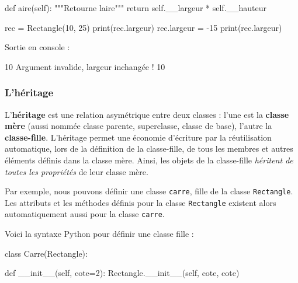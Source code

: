 \documentclass[
  letterpaper,
  DIV=11,
  numbers=noendperiod]{scrartcl}
\newenvironment{Shaded}{\begin{snugshade}}{\end{snugshade}}
\newcommand{\BuiltInTok}[1]{\textcolor[rgb]{0.00,0.23,0.31}{#1}}
\newcommand{\CommentTok}[1]{\textcolor[rgb]{0.37,0.37,0.37}{#1}}
\newcommand{\ControlFlowTok}[1]{\textcolor[rgb]{0.00,0.23,0.31}{#1}}
\newcommand{\DecValTok}[1]{\textcolor[rgb]{0.68,0.00,0.00}{#1}}
\newcommand{\FunctionTok}[1]{\textcolor[rgb]{0.28,0.35,0.67}{#1}}
\newcommand{\KeywordTok}[1]{\textcolor[rgb]{0.00,0.23,0.31}{#1}}
\newcommand{\NormalTok}[1]{\textcolor[rgb]{0.00,0.23,0.31}{#1}}
\newcommand{\OperatorTok}[1]{\textcolor[rgb]{0.37,0.37,0.37}{#1}}
\newcommand{\VariableTok}[1]{\textcolor[rgb]{0.07,0.07,0.07}{#1}}
\begin{document}
\begin{Shaded}
\begin{Highlighting}[]
    \KeywordTok{def}\NormalTok{ aire(}\VariableTok{self}\NormalTok{):}
        \CommentTok{"""Retourne l\textquotesingle{}aire"""}
        \ControlFlowTok{return} \VariableTok{self}\NormalTok{.\_\_largeur }\OperatorTok{*} \VariableTok{self}\NormalTok{.\_\_hauteur}


\NormalTok{rec }\OperatorTok{=}\NormalTok{ Rectangle(}\DecValTok{10}\NormalTok{, }\DecValTok{25}\NormalTok{)}
\BuiltInTok{print}\NormalTok{(rec.largeur)}
\NormalTok{rec.largeur }\OperatorTok{=} \OperatorTok{{-}}\DecValTok{15}
\BuiltInTok{print}\NormalTok{(rec.largeur)}
\end{Highlighting}
\end{Shaded}

Sortie en console :

\begin{Shaded}
\begin{Highlighting}[]
\DecValTok{10}
\NormalTok{Argument invalide, largeur inchangée }\OperatorTok{!}
\DecValTok{10}
\end{Highlighting}
\end{Shaded}

\hypertarget{lhuxe9ritage}{%
\subsubsection{L'héritage}\label{lhuxe9ritage}}

L'\textbf{héritage} est une relation asymétrique entre deux classes :
l'une est la \textbf{classe mère} (aussi nommée classe parente,
superclasse, classe de base), l'autre la \textbf{classe-fille}.
L'héritage permet une économie d'écriture par la réutilisation
automatique, lors de la définition de la classe-fille, de tous les
membres et autres éléments définis dans la classe mère. Ainsi, les
objets de la classe-fille \emph{héritent de toutes les propriétés} de
leur classe mère.

Par exemple, nous pouvons définir une classe \texttt{carre}, fille de la
classe \texttt{Rectangle}. Les attributs et les méthodes définis pour la
classe \texttt{Rectangle} existent alors automatiquement aussi pour la
classe \texttt{carre}.

Voici la syntaxe Python pour définir une classe fille :

\begin{Shaded}
\begin{Highlighting}[]
\KeywordTok{class}\NormalTok{ Carre(Rectangle):}

    \KeywordTok{def} \FunctionTok{\_\_init\_\_}\NormalTok{(}\VariableTok{self}\NormalTok{, cote}\OperatorTok{=}\DecValTok{2}\NormalTok{):}
\NormalTok{        Rectangle.}\FunctionTok{\_\_init\_\_}\NormalTok{(}\VariableTok{self}\NormalTok{, cote, cote)}
\end{Highlighting}
\end{Shaded}
\end{document}
